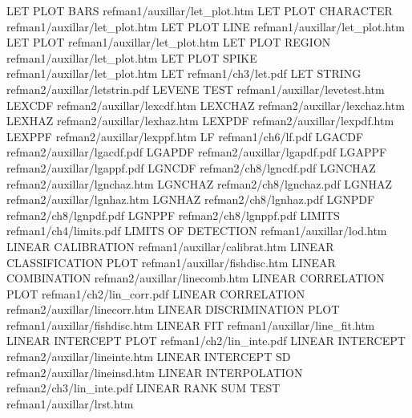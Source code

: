 LET PLOT BARS                           refman1/auxillar/let_plot.htm
LET PLOT CHARACTER                      refman1/auxillar/let_plot.htm
LET PLOT LINE                           refman1/auxillar/let_plot.htm
LET PLOT                                refman1/auxillar/let_plot.htm
LET PLOT REGION                         refman1/auxillar/let_plot.htm
LET PLOT SPIKE                          refman1/auxillar/let_plot.htm
LET                                     refman1/ch3/let.pdf
LET STRING                              refman2/auxillar/letstrin.pdf
LEVENE TEST                             refman1/auxillar/levetest.htm
LEXCDF                                  refman2/auxillar/lexcdf.htm
LEXCHAZ                                 refman2/auxillar/lexchaz.htm
LEXHAZ                                  refman2/auxillar/lexhaz.htm
LEXPDF                                  refman2/auxillar/lexpdf.htm
LEXPPF                                  refman2/auxillar/lexppf.htm
LF                                      refman1/ch6/lf.pdf
LGACDF                                  refman2/auxillar/lgacdf.pdf
LGAPDF                                  refman2/auxillar/lgapdf.pdf
LGAPPF                                  refman2/auxillar/lgappf.pdf
LGNCDF                                  refman2/ch8/lgncdf.pdf
LGNCHAZ                                 refman2/auxillar/lgnchaz.htm
LGNCHAZ                                 refman2/ch8/lgnchaz.pdf
LGNHAZ                                  refman2/auxillar/lgnhaz.htm
LGNHAZ                                  refman2/ch8/lgnhaz.pdf
LGNPDF                                  refman2/ch8/lgnpdf.pdf
LGNPPF                                  refman2/ch8/lgnppf.pdf
LIMITS                                  refman1/ch4/limits.pdf
LIMITS OF DETECTION                     refman1/auxillar/lod.htm
LINEAR CALIBRATION                      refman1/auxillar/calibrat.htm
LINEAR CLASSIFICATION PLOT              refman1/auxillar/fishdisc.htm
LINEAR COMBINATION                      refman2/auxillar/linecomb.htm
LINEAR CORRELATION PLOT                 refman1/ch2/lin_corr.pdf
LINEAR CORRELATION                      refman2/auxillar/linecorr.htm
LINEAR DISCRIMINATION PLOT              refman1/auxillar/fishdisc.htm
LINEAR FIT                              refman1/auxillar/line_fit.htm
LINEAR INTERCEPT PLOT                   refman1/ch2/lin_inte.pdf
LINEAR INTERCEPT                        refman2/auxillar/lineinte.htm
LINEAR INTERCEPT SD                     refman2/auxillar/lineinsd.htm
LINEAR INTERPOLATION                    refman2/ch3/lin_inte.pdf
LINEAR RANK SUM TEST                    refman1/auxillar/lrst.htm

